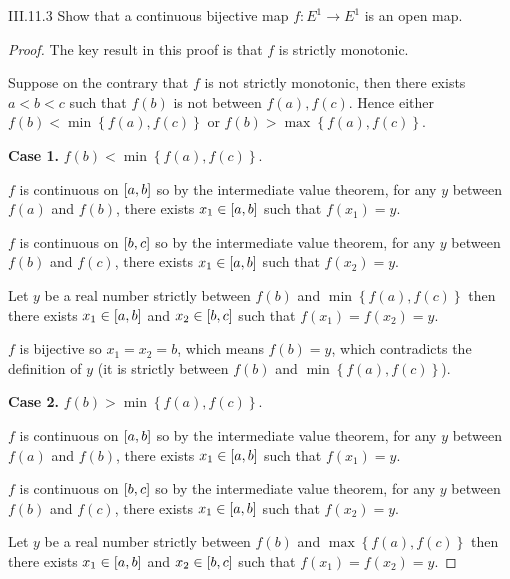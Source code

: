 \begin{problem}{III.11.3}
Show that a continuous bijective map \( f: E^{1} \to E^{1} \) is an open map.
\end{problem}

\begin{proof}
    The key result in this proof is that \( f \) is strictly monotonic.

    Suppose on the contrary that \( f \) is not strictly monotonic, then there exists \( a < b < c \) such that \( f(b) \) is not between \( f(a), f(c) \). Hence either \( f(b) < \min\left\{ f(a), f(c) \right\} \) or \( f(b) > \max\left\{ f(a), f(c) \right\} \).

    \textbf{Case 1.} \( f(b) < \min\left\{ f(a), f(c) \right\} \).

    \( f \) is continuous on \( \left\lbrack{a, b}\right\rbrack \) so by the intermediate value theorem, for any \( y \) between \( f(a) \) and \( f(b) \), there exists \( x_{1} \in \left\lbrack{a, b}\right\rbrack \) such that \( f(x_{1}) = y \).

    \( f \) is continuous on \( \left\lbrack{b, c}\right\rbrack \) so by the intermediate value theorem, for any \( y \) between \( f(b) \) and \( f(c) \), there exists \( x_{1} \in \left\lbrack{a, b}\right\rbrack \) such that \( f(x_{2}) = y \).

    Let \( y \) be a real number strictly between \( f(b) \) and \( \min\left\{ f(a), f(c) \right\} \) then there exists \( x_{1} \in \left\lbrack{a, b}\right\rbrack \) and \( x_{2} \in \left\lbrack{b, c}\right\rbrack \) such that \( f(x_{1}) = f(x_{2}) = y \).

    \( f \) is bijective so \( x_{1} = x_{2} = b \), which means \( f(b) = y \), which contradicts the definition of \( y \) (it is strictly between \( f(b) \) and \( \min\left\{ f(a), f(c) \right\} \)).

    \textbf{Case 2.} \( f(b) > \min\left\{ f(a), f(c) \right\} \).

    \( f \) is continuous on \( \left\lbrack{a, b}\right\rbrack \) so by the intermediate value theorem, for any \( y \) between \( f(a) \) and \( f(b) \), there exists \( x_{1} \in \left\lbrack{a, b}\right\rbrack \) such that \( f(x_{1}) = y \).

    \( f \) is continuous on \( \left\lbrack{b, c}\right\rbrack \) so by the intermediate value theorem, for any \( y \) between \( f(b) \) and \( f(c) \), there exists \( x_{1} \in \left\lbrack{a, b}\right\rbrack \) such that \( f(x_{2}) = y \).

    Let \( y \) be a real number strictly between \( f(b) \) and \( \max\left\{ f(a), f(c) \right\} \) then there exists \( x_{1} \in \left\lbrack{a, b}\right\rbrack \) and \( x_{2} \in \left\lbrack{b, c}\right\rbrack \) such that \( f(x_{1}) = f(x_{2}) = y \).


\end{proof}
